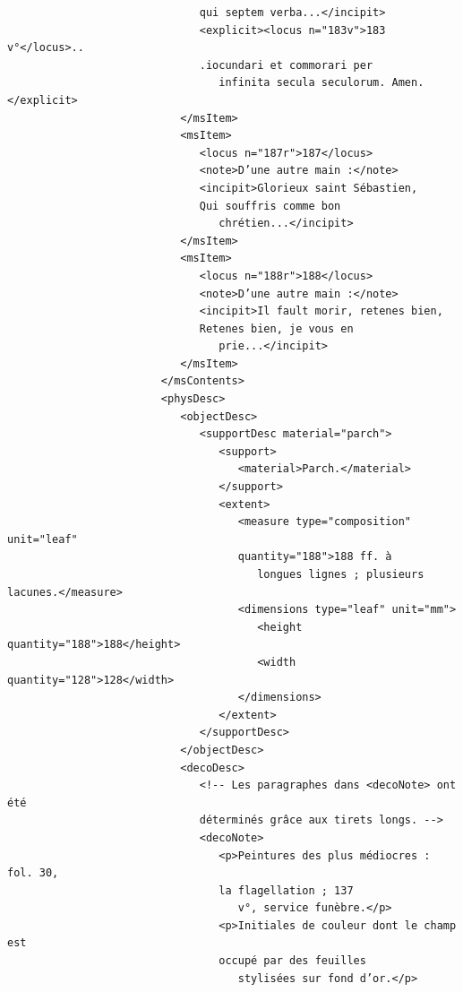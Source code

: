 \documentclass[a4paper,12pt,twoside]{book}
\begin{document}
\begin{verbatim}
                              qui septem verba...</incipit>
                              <explicit><locus n="183v">183 v°</locus>..
                              .iocundari et commorari per
                                 infinita secula seculorum. Amen.</explicit>
                           </msItem>
                           <msItem>
                              <locus n="187r">187</locus>
                              <note>D’une autre main :</note>
                              <incipit>Glorieux saint Sébastien, 
                              Qui souffris comme bon
                                 chrétien...</incipit>
                           </msItem>
                           <msItem>
                              <locus n="188r">188</locus>
                              <note>D’une autre main :</note>
                              <incipit>Il fault morir, retenes bien,
                              Retenes bien, je vous en
                                 prie...</incipit>
                           </msItem>
                        </msContents>
                        <physDesc>
                           <objectDesc>
                              <supportDesc material="parch">
                                 <support>
                                    <material>Parch.</material>
                                 </support>
                                 <extent>
                                    <measure type="composition" unit="leaf"
                                    quantity="188">188 ff. à
                                       longues lignes ; plusieurs lacunes.</measure>
                                    <dimensions type="leaf" unit="mm">
                                       <height quantity="188">188</height>
                                       <width quantity="128">128</width>
                                    </dimensions>
                                 </extent>
                              </supportDesc>
                           </objectDesc>
                           <decoDesc>
                              <!-- Les paragraphes dans <decoNote> ont été 
                              déterminés grâce aux tirets longs. -->
                              <decoNote>
                                 <p>Peintures des plus médiocres : fol. 30, 
                                 la flagellation ; 137
                                    v°, service funèbre.</p>
                                 <p>Initiales de couleur dont le champ est 
                                 occupé par des feuilles
                                    stylisées sur fond d’or.</p>

\end{verbatim}
\end{document}
